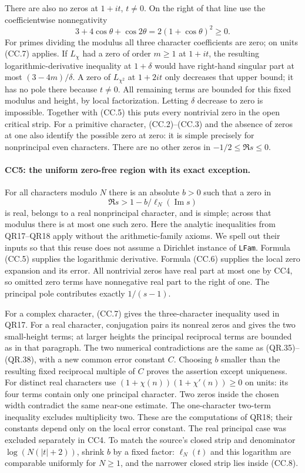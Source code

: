 There are also no zeros at $1+it$, $t\ne0$. On the right of
that line use the coefficientwise nonnegativity
\[
 3+4\cos\theta+\cos2\theta=2(1+\cos\theta)^2\ge0.
                                                               \tag{CC.7}
\]
For primes dividing the modulus all three character coefficients
are zero; on units (CC.7) applies. If $L_\chi$ had a zero of
order $m\ge1$ at $1+it$, the resulting logarithmic-derivative
inequality at $1+\delta$ would have right-hand singular part
at most $(3-4m)/\delta$. A zero of $L_{\chi^2}$ at $1+2it$
only decreases that upper bound; it has no pole there because
$t\ne0$. All remaining terms are bounded for this fixed
modulus and height, by local factorization. Letting $\delta$
decrease to zero is impossible. Together with (CC.5) this puts
every nontrivial zero in the open critical strip.
For a primitive character, (CC.2)--(CC.3) and the absence of
zeros at one also identify the possible zero at zero: it is
simple precisely for nonprincipal even characters. There are
no other zeros in $-1/2\le\Re s\le0$.

\paragraph{CC5: the uniform zero-free region with its exact exception.}
For all characters modulo $N$ there is an absolute $b>0$ such
that a zero in
\[
           \Re s>1-b/\ell_N(\operatorname{Im}s)           \tag{CC.8}
\]
is real, belongs to a real nonprincipal character, and is simple;
across that modulus there is at most one such zero.
Here the analytic inequalities from QR17--QR18 apply without
the arithmetic-family axioms. We spell out their inputs so
that this reuse does not assume a Dirichlet instance of \texttt{LFam}.
Formula (CC.5) supplies the logarithmic derivative. Formula
(CC.6) supplies the local zero expansion and its error.
All nontrivial zeros have real part at most one by CC4,
so omitted zero terms have nonnegative real part to the right
of one. The principal pole contributes exactly $1/(s-1)$.

For a complex character, (CC.7) gives the three-character
inequality used in QR17. For a real character, conjugation
pairs its nonreal zeros and gives the two small-height terms;
at larger heights the principal reciprocal terms are bounded
as in that paragraph. The two numerical contradictions are
the same as (QR.35)--(QR.38), with a new common error constant
$C$. Choosing $b$ smaller than the resulting fixed reciprocal
multiple of $C$ proves the assertion except uniqueness.
For distinct real characters use
$(1+\chi(n))(1+\chi'(n))\ge0$ on units: its four terms
contain only one principal character. Two zeros inside the
chosen width contradict the same near-one estimate. The
one-character two-term inequality excludes multiplicity two.
These are the computations of QR18; their constants depend
only on the local error constant. The real principal case
was excluded separately in CC4. To match the source's closed strip
and denominator $\log(N(|t|+2))$, shrink $b$ by a fixed factor:
$\ell_N(t)$ and this logarithm are comparable uniformly for $N\ge1$,
and the narrower closed strip lies inside (CC.8).

